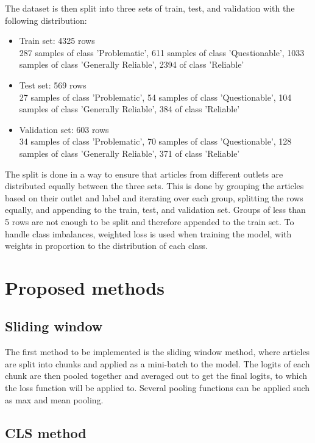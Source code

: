 The dataset is then split into three sets of train, test, and validation with the following distribution:
\begin{itemize}
    \item Train set: 4325 rows \\
          287 samples of class 'Problematic', 611 samples of class 'Questionable', 1033 samples of class 'Generally Reliable', 2394 of class 'Reliable'
    \item Test set: 569 rows \\
          27 samples of class 'Problematic', 54 samples of class 'Questionable', 104 samples of class 'Generally Reliable', 384 of class 'Reliable'
    \item Validation set: 603 rows \\
          34 samples of class 'Problematic', 70 samples of class 'Questionable', 128 samples of class 'Generally Reliable', 371 of class 'Reliable'
\end{itemize}

The split is done in a way to ensure that articles from different outlets are distributed equally between the three sets. This is done by grouping the articles based on their outlet and label and iterating over each group, splitting the rows equally, and appending to the train, test, and validation set. Groups of less than 5 rows are not enough to be split and therefore appended to the train set. To handle class imbalances, weighted loss is used when training the model, with weights in proportion to the distribution of each class.

\section{Proposed methods}

\subsection{Sliding window}

The first method to be implemented is the sliding window method, where articles are split into chunks and applied as a mini-batch to the model. The logits of each chunk are then pooled together and averaged out to get the final logits, to which the loss function will be applied to. Several pooling functions can be applied such as max and mean pooling.

\subsection{CLS method}

